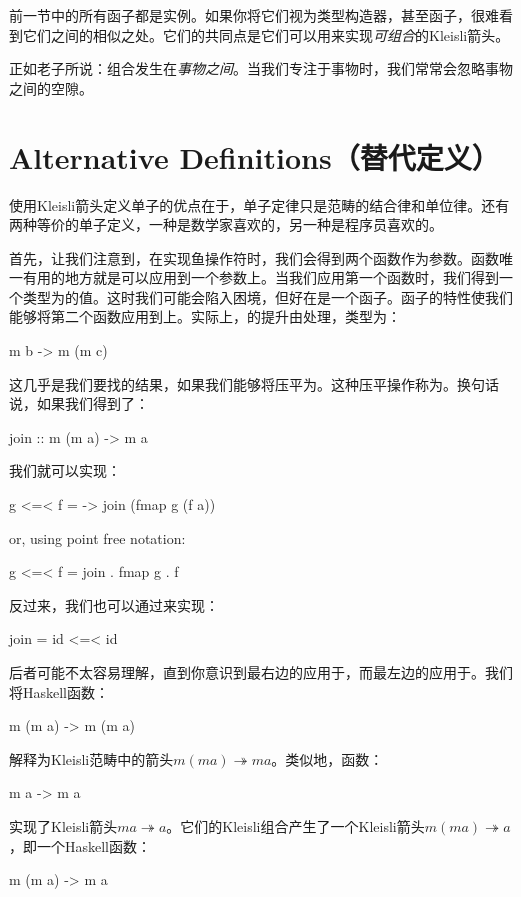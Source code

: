 \documentclass[DaoFP]{subfiles}
\begin{document}
    前一节中的所有函子都是实例。如果你将它们视为类型构造器，甚至函子，很难看到它们之间的相似之处。它们的共同点是它们可以用来实现\emph{可组合}的Kleisli箭头。

    正如老子所说：组合发生在\emph{事物之间}。当我们专注于事物时，我们常常会忽略事物之间的空隙。

    \section{Alternative Definitions（替代定义）}

    使用Kleisli箭头定义单子的优点在于，单子定律只是范畴的结合律和单位律。还有两种等价的单子定义，一种是数学家喜欢的，另一种是程序员喜欢的。

    首先，让我们注意到，在实现鱼操作符时，我们会得到两个函数作为参数。函数唯一有用的地方就是可以应用到一个参数上。当我们应用第一个函数时，我们得到一个类型为的值。这时我们可能会陷入困境，但好在是一个函子。函子的特性使我们能够将第二个函数应用到上。实际上，的提升由处理，类型为：
    \begin{haskell}
        m b -> m (m c)
    \end{haskell}
    这几乎是我们要找的结果，如果我们能够将压平为。这种压平操作称为。换句话说，如果我们得到了：
    \begin{haskell}
        join ::  m (m a) -> m a
    \end{haskell}
    我们就可以实现\hask{<=<}：
    \begin{haskell}
        g <=< f = \a -> join (fmap g (f a))
    \end{haskell}
    or, using point free notation:
    \begin{haskell}
        g <=< f = join . fmap g . f
    \end{haskell}

    反过来，我们也可以通过\hask{<=<}来实现：
    \begin{haskell}
        join = id <=< id
    \end{haskell}
    后者可能不太容易理解，直到你意识到最右边的应用于，而最左边的应用于。我们将Haskell函数：
    \begin{haskell}
        m (m a) -> m (m a)
    \end{haskell}
    解释为Kleisli范畴中的箭头$ m (m a) \twoheadrightarrow m a$。类似地，函数：
    \begin{haskell}
        m a -> m a
    \end{haskell}
    实现了Kleisli箭头$m a \twoheadrightarrow a$。它们的Kleisli组合产生了一个Kleisli箭头$m (m a) \twoheadrightarrow a$，即一个Haskell函数：
    \begin{haskell}
        m (m a) -> m a
    \end{haskell}
\end{document}
